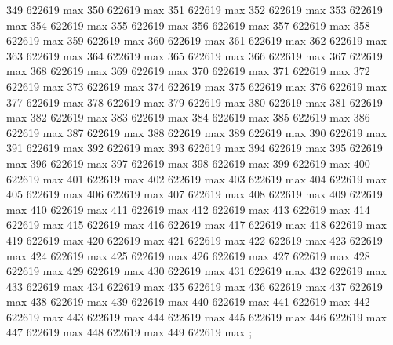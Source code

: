 {349 622619 max
350 622619 max
351 622619 max
352 622619 max
353 622619 max
354 622619 max
355 622619 max
356 622619 max
357 622619 max
358 622619 max
359 622619 max
360 622619 max
361 622619 max
362 622619 max
363 622619 max
364 622619 max
365 622619 max
366 622619 max
367 622619 max
368 622619 max
369 622619 max
370 622619 max
371 622619 max
372 622619 max
373 622619 max
374 622619 max
375 622619 max
376 622619 max
377 622619 max
378 622619 max
379 622619 max
380 622619 max
381 622619 max
382 622619 max
383 622619 max
384 622619 max
385 622619 max
386 622619 max
387 622619 max
388 622619 max
389 622619 max
390 622619 max
391 622619 max
392 622619 max
393 622619 max
394 622619 max
395 622619 max
396 622619 max
397 622619 max
398 622619 max
399 622619 max
400 622619 max
401 622619 max
402 622619 max
403 622619 max
404 622619 max
405 622619 max
406 622619 max
407 622619 max
408 622619 max
409 622619 max
410 622619 max
411 622619 max
412 622619 max
413 622619 max
414 622619 max
415 622619 max
416 622619 max
417 622619 max
418 622619 max
419 622619 max
420 622619 max
421 622619 max
422 622619 max
423 622619 max
424 622619 max
425 622619 max
426 622619 max
427 622619 max
428 622619 max
429 622619 max
430 622619 max
431 622619 max
432 622619 max
433 622619 max
434 622619 max
435 622619 max
436 622619 max
437 622619 max
438 622619 max
439 622619 max
440 622619 max
441 622619 max
442 622619 max
443 622619 max
444 622619 max
445 622619 max
446 622619 max
447 622619 max
448 622619 max
449 622619 max
};
